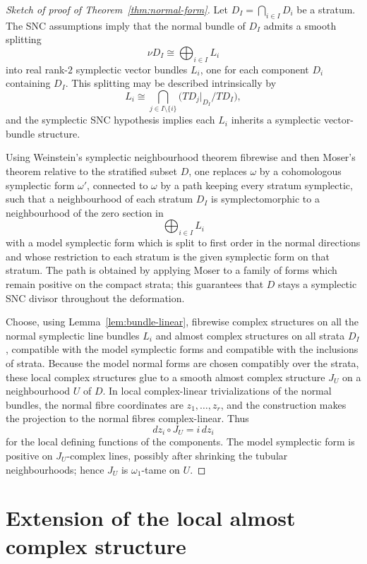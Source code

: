 \documentclass[11pt]{article}
\theoremstyle{definition}
\numberwithin{equation}{section}
\begin{document}
\begin{proof}[Sketch of proof of Theorem~\ref{thm:normal-form}]
Let $D_I=\bigcap_{i\in I}D_i$ be a stratum.  The SNC assumptions imply that the normal bundle of $D_I$ admits a smooth splitting
\[
\nu D_I\cong\bigoplus_{i\in I}L_i
\]
into real rank-$2$ symplectic vector bundles $L_i$, one for each component $D_i$ containing $D_I$.  This splitting may be described intrinsically by
\[
L_i\cong \bigcap_{j\in I\setminus\{i\}} \bigl(TD_j|_{D_I}/TD_I\bigr),
\]
and the symplectic SNC hypothesis implies each $L_i$ inherits a symplectic vector-bundle structure.

Using Weinstein's symplectic neighbourhood theorem fibrewise and then Moser's theorem relative to the stratified subset $D$, one replaces $\omega$ by a cohomologous symplectic form $\omega'$, connected to $\omega$ by a path keeping every stratum symplectic, such that a neighbourhood of each stratum $D_I$ is symplectomorphic to a neighbourhood of the zero section in
\[
\bigoplus_{i\in I}L_i
\]
with a model symplectic form which is split to first order in the normal directions and whose restriction to each stratum is the given symplectic form on that stratum.  The path is obtained by applying Moser to a family of forms which remain positive on the compact strata; this guarantees that $D$ stays a symplectic SNC divisor throughout the deformation.

Choose, using Lemma~\ref{lem:bundle-linear}, fibrewise complex structures on all the normal symplectic line bundles $L_i$ and almost complex structures on all strata $D_I$, compatible with the model symplectic forms and compatible with the inclusions of strata.  Because the model normal forms are chosen compatibly over the strata, these local complex structures glue to a smooth almost complex structure $J_U$ on a neighbourhood $U$ of $D$.  In local complex-linear trivializations of the normal bundles, the normal fibre coordinates are $z_1,\dots,z_r$, and the construction makes the projection to the normal fibres complex-linear.  Thus
\[
dz_i\circ J_U=i\,dz_i
\]
for the local defining functions of the components.  The model symplectic form is positive on $J_U$-complex lines, possibly after shrinking the tubular neighbourhoods; hence $J_U$ is $\omega_1$-tame on $U$.
\end{proof}

\section{Extension of the local almost complex structure}
\end{document}
